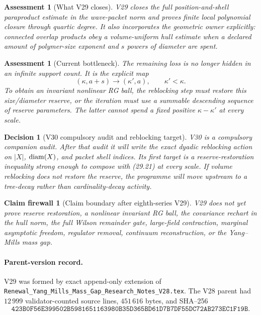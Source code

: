 \documentclass[11pt,oneside]{book}
\newtheorem{assessment}[theorem]{Assessment}
\newtheorem{firewall}[theorem]{Claim firewall}
\newtheorem{decision}[theorem]{Decision}
\theoremstyle{definition}
\theoremstyle{remark}
\begin{document}
\begin{assessment}[What V29 closes]
\label{ass:e8v29-closes}
V29 closes the full position-and-shell paraproduct estimate in the
wave-packet norm and proves finite local polynomial closure through
quartic degree.  It also incorporates the geometric owner explicitly:
connected overlap products obey a volume-uniform hull estimate when a
declared amount of polymer-size exponent and \(s\) powers of diameter
are spent.
\end{assessment}

\begin{assessment}[Current bottleneck]
\label{ass:e8v29-remains}
The remaining loss is no longer hidden in an infinite support count.
It is the explicit map
\[
 (\kappa,a+s)\longrightarrow(\kappa',a),\qquad \kappa'<\kappa.   \tag{29.25}
\]
To obtain an invariant nonlinear RG ball, the reblocking step must
restore this size/diameter reserve, or the iteration must use a
summable descending sequence of reserve parameters.  The latter
cannot spend a fixed positive \(\kappa-\kappa'\) at every scale.
\end{assessment}

\begin{decision}[V30 compulsory audit and reblocking target]
\label{dec:e8v29-v30}
V30 is a compulsory companion audit.  After that audit it will write
the exact dyadic reblocking action on \(|X|\), \({\rm diam}(X)\), and
packet shell indices.  Its first target is a reserve-restoration
inequality strong enough to compose with (29.21) at every scale.  If
volume reblocking does not restore the reserve, the programme will
move upstream to a tree-decay rather than cardinality-decay activity.
\end{decision}

\begin{firewall}[Claim boundary after eighth-series V29]
\label{fire:e8v29-claim}
V29 does not yet prove reserve restoration, a nonlinear invariant RG
ball, the covariance rechart in the hull norm, the full Wilson
remainder gate, large-field contraction, marginal asymptotic freedom,
regulator removal, continuum reconstruction, or the Yang--Mills mass
gap.
\end{firewall}

\paragraph{Parent-version record.}
V29 was formed by exact append-only extension of
\texttt{Renewal\_Yang\_Mills\_Mass\_Gap\_Research\_Notes\_V28.tex}.
The V28 parent had \(12\,999\) validator-counted source lines,
\(451\,616\) bytes, and SHA--256
\[
\texttt{423B0F56E399502B5981651163980B35D365BD61D7B7DF55DC72AB273EC1F19B}.
\]
\end{document}
